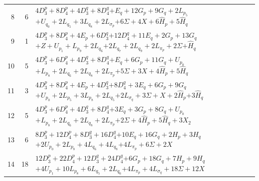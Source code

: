 \documentclass[11pt,a4paper]{article}
\theoremstyle{remark}
\begin{document}
\begin{longtable}{rrp{12.7cm}}
8&6&\( 4D_3^p + 8D_4^p + 4D_3^q + 8D_4^q \)\newline\( + E_q + 12G_p + 9G_q + 2L_{p_{5}} \)\newline\( + U_{q_{0}} + 2L_{q_{5}} + 3L_{q_{8}} + 2L_{\sigma_p} \)\newline\( + 6\Sigma + 4X + 6\widehat H_p + 5\widehat H_q \)\\[3pt]
9&1&\( 4D_3^p + 8D_4^p + 4E_p + 6D_3^q \)\newline\( + 12D_4^q + 11E_q + 2G_p + 13G_q \)\newline\( + Z + U_{p_{1}} + L_{p_{9}} + 2L_{q_{6}} \)\newline\( + 2L_{q_{7}} + 2L_{q_{9}} + 2L_{\pi_p} + 2\Sigma \)\newline\( + \widehat H_q \)\\[3pt]
10&5&\( 4D_3^p + 6D_4^p + 4D_3^q + 8D_4^q \)\newline\( + E_q + 6G_p + 11G_q + U_{p_{0}} \)\newline\( + L_{p_{8}} + 2L_{q_{6}} + 2L_{q_{8}} + 2L_{\pi_p} \)\newline\( + 5\Sigma + 3X + 4\widehat H_p + 5\widehat H_q \)\\[3pt]
11&3&\( 4D_3^p + 8D_4^p + 4E_p + 4D_3^q \)\newline\( + 8D_4^q + 3E_q + 6G_p + 9G_q \)\newline\( + U_{p_{0}} + 2L_{p_{5}} + 3L_{p_{8}} + 2L_{q_{5}} \)\newline\( + 2L_{\sigma_q} + 3\Sigma + X + 2\widehat H_p \)\newline\( + 3\widehat H_q \)\\[3pt]
12&5&\( 4D_3^p + 6D_4^p + 4D_3^q + 8D_4^q \)\newline\( + 3E_q + 3G_p + 8G_q + U_{p_{0}} \)\newline\( + L_{p_{8}} + 2L_{q_{6}} + 2L_{q_{8}} + 2L_{\pi_p} \)\newline\( + 2\Sigma + 4\widehat H_p + 5\widehat H_q + 3X_2 \)\\[3pt]
13&6&\( 8D_3^p + 12D_4^p + 8D_3^q + 16D_4^q \)\newline\( + 10E_q + 16G_q + 2H_p + 3H_q \)\newline\( + 2U_{p_{0}} + 2L_{p_{8}} + 4L_{q_{6}} + 4L_{q_{8}} \)\newline\( + 4L_{\pi_p} + 6\Sigma + 2X \)\\[3pt]
14&18&\( 12D_3^p + 22D_4^p + 12D_3^q + 24D_4^q \)\newline\( + 6G_p + 18G_q + 7H_p + 9H_q \)\newline\( + 4U_{p_{1}} + 10L_{p_{8}} + 6L_{q_{5}} + 2L_{q_{6}} \)\newline\( + 4L_{\pi_p} + 4L_{\sigma_q} + 18\Sigma + 12X \)\\[3pt]

\end{longtable}
\end{document}
